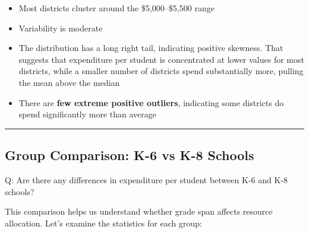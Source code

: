 \documentclass[
  12pt,
  letterpaper,
]{scrbook}
\newenvironment{Shaded}{\begin{snugshade}}{\end{snugshade}}
\newcommand{\AttributeTok}[1]{\textcolor[rgb]{0.40,0.45,0.13}{#1}}
\newcommand{\CommentTok}[1]{\textcolor[rgb]{0.37,0.37,0.37}{#1}}
\newcommand{\ConstantTok}[1]{\textcolor[rgb]{0.56,0.35,0.01}{#1}}
\newcommand{\FunctionTok}[1]{\textcolor[rgb]{0.28,0.35,0.67}{#1}}
\newcommand{\NormalTok}[1]{\textcolor[rgb]{0.00,0.23,0.31}{#1}}
\newcommand{\OtherTok}[1]{\textcolor[rgb]{0.00,0.23,0.31}{#1}}
\newcommand{\SpecialCharTok}[1]{\textcolor[rgb]{0.37,0.37,0.37}{#1}}
\providecommand{\tightlist}{%
  \setlength{\itemsep}{0pt}\setlength{\parskip}{0pt}}
\renewcommand{\tightlist}{\setlength{\itemsep}{0.5\baselineskip}\setlength{\parskip}{0.2\baselineskip}}
\theoremstyle{plain}
\theoremstyle{definition}
\theoremstyle{remark}
\begin{document}
\begin{itemize}
\tightlist
\item
  Most districts cluster around the {\$5,000}--{\$5,500} range
\item
  Variability is moderate
\item
  The distribution has a long right tail, indicating positive skewness.
  That suggests that expenditure per student is concentrated at lower
  values for most districts, while a smaller number of districts spend
  substantially more, pulling the mean above the median
\item
  There are \textbf{few extreme positive outliers}, indicating some
  districts do spend significantly more than average
\end{itemize}

\begin{center}\rule{0.5\linewidth}{0.5pt}\end{center}

\subsection{Group Comparison: K-6 vs K-8
Schools}\label{group-comparison-k-6-vs-k-8-schools}

Q: Are there any differences in expenditure per student between K-6 and
K-8 schools?

This comparison helps us understand whether grade span affects resource
allocation. Let's examine the statistics for each group:

\begin{Shaded}
\end{Shaded}
\end{document}

